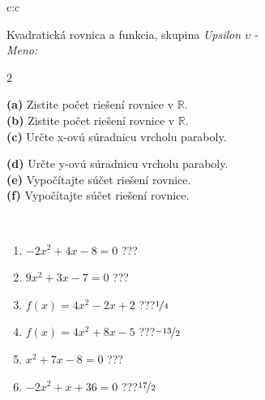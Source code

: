 \documentclass[10pt]{report}
\begin{document}
\begin{tabular}{c:c}
\begin{minipage}[c][104.5mm][t]{0.5\linewidth}
\begin{center}
\vspace{7mm}
{\huge {\LARGE Kvadratická rovnica a funkcia}, skupina \textit{Upsilon $\upsilon$} -}\\[5mm]
\textit{Meno:}\phantom{xxxxxxxxxxxxxxxxxxxxxxxxxxxxxxxxxxxxxxxxxxxxxxxxxxxxxxxxxxxxxxxxx}\\[5mm]
\begin{minipage}{0.95\linewidth}
\begin{center}
{\small \begin{multicols}{2} \raggedright
\textbf{(a)} Zistite počet riešení rovnice v \(\mathbb{R}\). \\[1mm]
\textbf{(b)} Zistite počet riešení rovnice v \(\mathbb{R}\). \\[1mm]
\textbf{(c)} Určte x-ovú súradnicu vrcholu paraboly. \par \columnbreak
\textbf{(d)} Určte y-ovú súradnicu vrcholu paraboly. \\[1mm]
\textbf{(e)} Vypočítajte súčet riešení rovnice. \\[1mm]
\textbf{(f)} Vypočítajte súčet riešení rovnice.
\end{multicols}
}
\end{center}
\end{minipage}
\\[4mm]
\begin{minipage}{0.79\linewidth}
\begin{center}
\begin{varwidth}{\linewidth}
\begin{enumerate}
\Large
\item $-2x^2+4x-8=0$\quad \dotfill\; ???\;\dotfill {}
\item $9x^2+3x-7=0$\quad \dotfill\; ???\;\dotfill {}
\item $f(x)=4x^2-2x+2$\quad \dotfill\; ???\;\dotfill \quad $\nicefrac{1}{4}$
\item $f(x)=4x^2+8x-5$\quad \dotfill\; ???\;\dotfill \quad $\nicefrac{-13}{2}$
\item $x^2+7x-8=0$\quad \dotfill\; ???\;\dotfill {}
\item $-2x^2+x+36=0$\quad \dotfill\; ???\;\dotfill \quad $\nicefrac{17}{2}$
\end{enumerate}
\end{varwidth}
\end{center}

\end{minipage}
\end{center}
\end{minipage}
\end{tabular}
\end{document}
